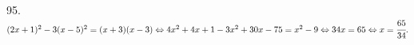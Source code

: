 95. $(2x+1)^2-3(x-5)^2=(x+3)(x-3)\Leftrightarrow 4x^2+4x+1-3x^2+30x-75=x^2-9\Leftrightarrow34x=65\Leftrightarrow x=\cfrac{65}{34}.$\\
